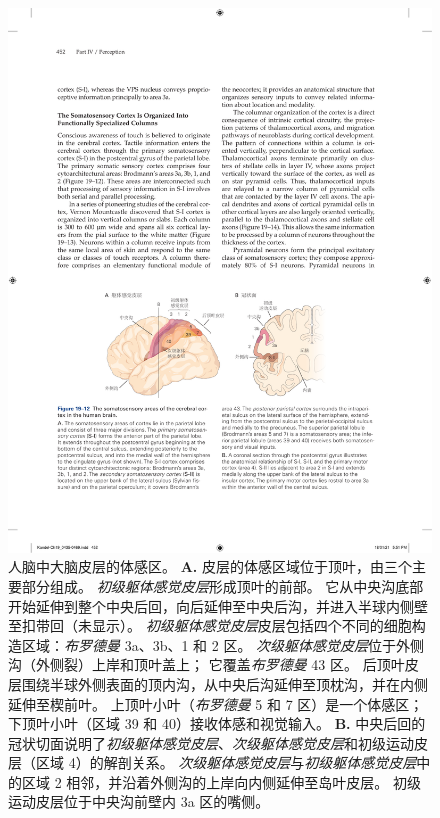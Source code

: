 \begin{figure}[htbp]
	\centering
	\includegraphics[width=1.0\linewidth]{chap19/fig_19_12}
	\caption{人脑中大脑皮层的体感区。
		\textbf{A.} 皮层的体感区域位于顶叶，由三个主要部分组成。
		\textit{初级躯体感觉皮层}形成顶叶的前部。
		它从中央沟底部开始延伸到整个中央后回，向后延伸至中央后沟，并进入半球内侧壁至扣带回（未显示）。
		\textit{初级躯体感觉皮层}皮层包括四个不同的细胞构造区域：\textit{布罗德曼} 3a、3b、1 和 2 区。
		\textit{次级躯体感觉皮层}位于外侧沟（外侧裂）上岸和顶叶盖上；
		它覆盖\textit{布罗德曼} 43 区。
		后顶叶皮层围绕半球外侧表面的顶内沟，从中央后沟延伸至顶枕沟，并在内侧延伸至楔前叶。
		上顶叶小叶（\textit{布罗德曼}  5 和 7 区）是一个体感区；
		下顶叶小叶（区域 39 和 40）接收体感和视觉输入。
		\textbf{B.} 中央后回的冠状切面说明了\textit{初级躯体感觉皮层}、\textit{次级躯体感觉皮层}和初级运动皮层（区域 4）的解剖关系。
		\textit{次级躯体感觉皮层}与\textit{初级躯体感觉皮层}中的区域 2 相邻，并沿着外侧沟的上岸向内侧延伸至岛叶皮层。
		初级运动皮层位于中央沟前壁内 3a 区的嘴侧。}
	\label{fig:19_12}
\end{figure}



